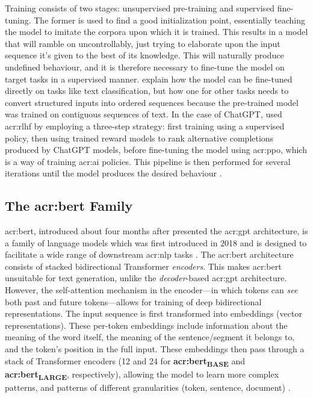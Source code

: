 Training consists of two stages: unsupervised pre-training and supervised fine-tuning. The former is used to find a good initialization point, essentially teaching the model to imitate the corpora upon which it is trained. This results in a model that will ramble on uncontrollably, just trying to elaborate upon the input sequence it's given to the best of its knowledge. This will naturally produce undefined behaviour, and it is therefore necessary to fine-tune the model on target tasks in a supervised manner. \cite[4]{radfordImprovingLanguageUnderstanding2018} explain how the model can be fine-tuned directly on tasks like text classification, but how one for other tasks needs to convert structured inputs into ordered sequences because the pre-trained model was trained on contiguous sequences of text. In the case of ChatGPT, \citeauthor{openaiIntroducingChatGPT2022} used \gls{acr:rlhf} by employing a three-step strategy: first training using a supervised policy, then using trained reward models to rank alternative completions produced by ChatGPT models, before fine-tuning the model using \gls{acr:ppo}, which is a way of training \acrshort{acr:ai} policies. This pipeline is then performed for several iterations until the model produces the desired behaviour \citep{openaiIntroducingChatGPT2022}.

\subsection[The BERT Family]{The \acrshort{acr:bert} Family}\label{subsec:bert}

\gls{acr:bert}, introduced about four months after \cite{radfordImprovingLanguageUnderstanding2018} presented the \acrshort{acr:gpt} architecture, is a family of language models which was first introduced in 2018 and is designed to facilitate a wide range of downstream \gls{acr:nlp} tasks \citep[5]{devlinBERTPretrainingDeep2019}. The \acrshort{acr:bert} architecture consists of stacked bidirectional Transformer \textit{encoders}. This makes \acrshort{acr:bert} unsuitable for text generation, unlike the \textit{decoder}-based \acrshort{acr:gpt} architecture. However, the self-attention mechanism in the encoder---in which tokens can \textit{see} both past and future tokens---allows for training of deep bidirectional representations. The input sequence is first transformed into embeddings (vector representations). These per-token embeddings include information about the meaning of the word itself, the meaning of the sentence/segment it belongs to, and the token's position in the full input. These embeddings then pass through a stack of Transformer encoders (12 and 24 for \textbf{\acrshort{acr:bert}\textsubscript{BASE}} and \textbf{\acrshort{acr:bert}\textsubscript{LARGE}}, respectively), allowing the model to learn more complex patterns, and patterns of different granularities (token, sentence, document) \citep[5]{devlinBERTPretrainingDeep2019}.

